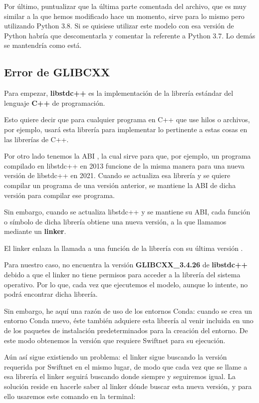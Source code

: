 Por último, puntualizar que la última parte comentada del archivo, que es muy similar a la que hemos modificado hace un momento, sirve para lo mismo pero utilizando Python 3.8. Si se quisiese utilizar este modelo con esa versión de Python habría que descomentarla y comentar la referente a Python 3.7. Lo demás se mantendría como está.

\subsection{Error de GLIBCXX}

Para empezar, \textbf{libstdc++} \cite{glibcxx} es la implementación de la librería estándar del lenguaje \textbf{C++} de programación.

Esto quiere decir que para cualquier programa en C++ que use hilos o archivos, por ejemplo, usará esta librería para implementar lo pertinente a estas cosas en las librerías de C++.

Por otro lado tenemos la \ac{ABI} \cite{glibcxx}, la cual sirve para que, por ejemplo, un programa compilado en libstdc++ en 2013 funcione de la misma manera para una nueva versión de libstdc++ en 2021. Cuando se actualiza esa librería y se quiere compilar un programa de una versión anterior, se mantiene la ABI de dicha versión para compilar ese programa.

Sin embargo, cuando se actualiza libstdc++ y se mantiene su ABI, cada función o símbolo de dicha librería obtiene una nueva versión, a la que llamamos mediante un \textbf{linker}.

El linker enlaza la llamada a una función de la librería con su última versión \cite{glibcxx}.

Para nuestro caso, no encuentra la versión \textbf{GLIBCXX\_3.4.26} de \textbf{libstdc++} debido a que el linker no tiene permisos para acceder a la librería del sistema operativo. Por lo que, cada vez que ejecutemos el modelo, aunque lo intente, no podrá encontrar dicha librería.

Sin embargo, he aquí una razón de uso de los entornos Conda: cuando se crea un entorno Conda nuevo, éste también adquiere esta librería al venir incluida en uno de los paquetes de instalación predeterminados para la creación del entorno. De este modo obtenemos la versión que requiere Swiftnet para su ejecución.

Aún así sigue existiendo un problema: el linker sigue buscando la versión requerida por Swiftnet en el mismo lugar, de modo que cada vez que se llame a esa librería el linker seguirá buscando donde siempre y seguiremos igual. La solución reside en hacerle saber al linker dónde buscar esta nueva versión, y para ello usaremos este comando en la terminal:

